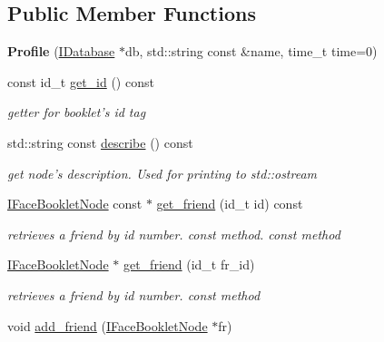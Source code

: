 \subsection*{Public Member Functions}
\begin{DoxyCompactItemize}
\item 
\hypertarget{classfb_1_1_profile_af7b0f910d3d3bcf897f535d106a530b1}{{\bfseries Profile} (\hyperlink{structfb_1_1_i_database}{I\+Database} $\ast$db, std\+::string const \&name, time\+\_\+t time=0)}\label{classfb_1_1_profile_af7b0f910d3d3bcf897f535d106a530b1}

\item 
const id\+\_\+t \hyperlink{classfb_1_1_profile_aee2df153f7923d0d5c24eb3c11dfff67}{get\+\_\+id} () const 
\begin{DoxyCompactList}\small\item\em getter for booklet's id tag \end{DoxyCompactList}\item 
\hypertarget{classfb_1_1_profile_a657f6cab3f2caee6fc4b9c8758a711b3}{std\+::string const \hyperlink{classfb_1_1_profile_a657f6cab3f2caee6fc4b9c8758a711b3}{describe} () const }\label{classfb_1_1_profile_a657f6cab3f2caee6fc4b9c8758a711b3}

\begin{DoxyCompactList}\small\item\em get node's description.  Used for printing to std\+::ostream \end{DoxyCompactList}\item 
\hyperlink{structfb_1_1_i_face_booklet_node}{I\+Face\+Booklet\+Node} const $\ast$ \hyperlink{classfb_1_1_profile_abd95cad4820c261601b20372f634bd2a}{get\+\_\+friend} (id\+\_\+t id) const 
\begin{DoxyCompactList}\small\item\em retrieves a friend by id number. const method.  const method \end{DoxyCompactList}\item 
\hyperlink{structfb_1_1_i_face_booklet_node}{I\+Face\+Booklet\+Node} $\ast$ \hyperlink{classfb_1_1_profile_a6c9f78b9cb0c1e30d22d17265736a956}{get\+\_\+friend} (id\+\_\+t fr\+\_\+id)
\begin{DoxyCompactList}\small\item\em retrieves a friend by id number.  const method \end{DoxyCompactList}\item 
\hypertarget{classfb_1_1_profile_a2090dc97786cb7cbabf2edf5065b0ddc}{void \hyperlink{classfb_1_1_profile_a2090dc97786cb7cbabf2edf5065b0ddc}{add\+\_\+friend} (\hyperlink{structfb_1_1_i_face_booklet_node}{I\+Face\+Booklet\+Node} $\ast$fr)}\label{classfb_1_1_profile_a2090dc97786cb7cbabf2edf5065b0ddc}


\end{DoxyCompactItemize}

